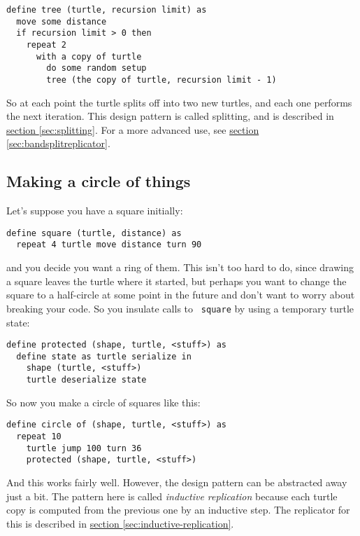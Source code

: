 \documentclass{report}
\newcommand{\Ref}[2]{\hyperref[#2]{#1 \ref*{#2}}}
\begin{document}
\begin{verbatim}
define tree (turtle, recursion limit) as
  move some distance
  if recursion limit > 0 then
    repeat 2
      with a copy of turtle
        do some random setup
        tree (the copy of turtle, recursion limit - 1)
\end{verbatim}

        So at each point the turtle splits off into two new turtles, and each one performs the next iteration. This design pattern is called splitting, and is
        described in \Ref{section}{sec:splitting}. For a more advanced use, see \Ref{section}{sec:bandsplitreplicator}.

\subsection {Making a circle of things} \label{sec:making-a-circle-of-things}
        Let's suppose you have a square initially:

\begin{verbatim}
define square (turtle, distance) as
  repeat 4 turtle move distance turn 90
\end{verbatim}

        \noindent and you decide you want a ring of them. This isn't too hard to do, since drawing a square leaves the turtle where it started, but perhaps you
        want to change the square to a half-circle at some point in the future and don't want to worry about breaking your code. So you insulate calls to {\tt
        square} by using a temporary turtle state:

\begin{verbatim}
define protected (shape, turtle, <stuff>) as
  define state as turtle serialize in
    shape (turtle, <stuff>)
    turtle deserialize state
\end{verbatim}

        So now you make a circle of squares like this:

\begin{verbatim}
define circle of (shape, turtle, <stuff>) as
  repeat 10
    turtle jump 100 turn 36
    protected (shape, turtle, <stuff>)
\end{verbatim}

        And this works fairly well. However, the design pattern can be abstracted away just a bit. The pattern here is called {\em inductive replication}
        because each turtle copy is computed from the previous one by an inductive step. The replicator for this is described in
        \Ref{section}{sec:inductive-replication}.
\end{document}
